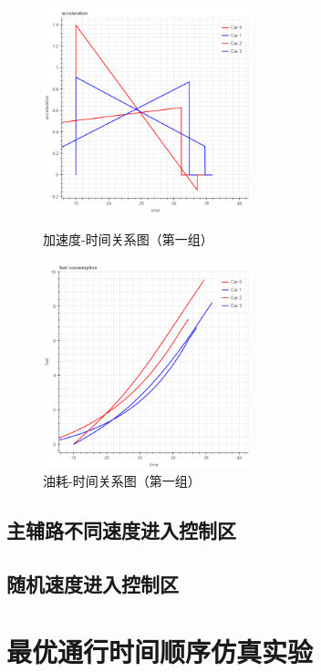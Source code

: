 \begin{figure}
\begin{minipage}{0.48\textwidth}
  \centering
  \includegraphics[height=6cm]{figures/sim_case1/acc.png}
  \caption{加速度-时间关系图（第一组）}
  \label{fig:case1:acc}
\end{minipage}\hfill
\begin{minipage}{0.48\textwidth}
  \centering
  \includegraphics[height=6cm]{figures/sim_case1/fuel.png}
  \caption{油耗-时间关系图（第一组）}
  \label{fig:case1:fuel}
\end{minipage}
\end{figure}

\subsection{主辅路不同速度进入控制区}
\subsection{随机速度进入控制区}

\section{最优通行时间顺序仿真实验}


